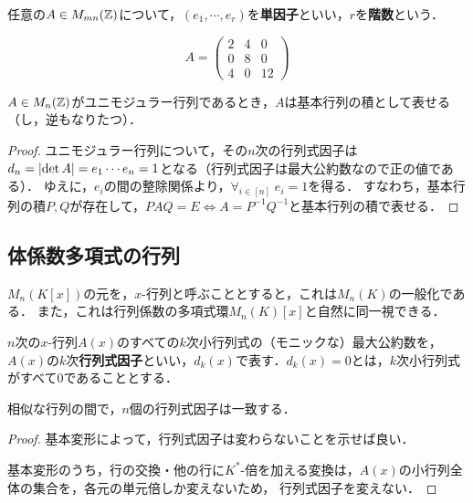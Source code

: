\documentclass[uplatex,dvipdfmx]{jsreport}
\begin{document}
\begin{definition}
    任意の$A\in M_{mn}(\mathbb{Z})$について，$(e_1,\cdots,e_r)$を\textbf{単因子}といい，$r$を\textbf{階数}という．
\end{definition}

\begin{example}
    \[A=\begin{pmatrix}2&4&0\\0&8&0\\4&0&12\end{pmatrix}\]
\end{example}

\begin{corollary}[ユニモジュラー行列の特徴付け]
    $A\in M_n(\mathbb{Z})$がユニモジュラー行列であるとき，$A$は基本行列の積として表せる（し，逆もなりたつ）．
\end{corollary}
\begin{proof}
    ユニモジュラー行列について，その$n$次の行列式因子は$d_n=\lvert\det A\rvert=e_1\cdots e_n=1$となる（行列式因子は最大公約数なので正の値である）．
    ゆえに，$e_i$の間の整除関係より，$\forall_{i\in[n]}\;e_i=1$を得る．
    すなわち，基本行列の積$P,Q$が存在して，$PAQ=E\Leftrightarrow A=P^{-1}Q^{-1}$と基本行列の積で表せる．
\end{proof}

\subsection{体係数多項式の行列}

\begin{tcolorbox}[colframe=ForestGreen, colback=ForestGreen!10!white,breakable,colbacktitle=ForestGreen!40!white,coltitle=black,fonttitle=\bfseries\sffamily,
title=]
    $M_n(K[x])$の元を，$x$-行列と呼ぶこととすると，これは$M_n(K)$の一般化である．
    また，これは行列係数の多項式環$M_n(K)[x]$と自然に同一視できる．
\end{tcolorbox}

\begin{definition}
    $n$次の$x$-行列$A(x)$のすべての$k$次小行列式の（モニックな）最大公約数を，$A(x)$の$k$次\textbf{行列式因子}といい，$d_k(x)$で表す．$d_k(x)=0$とは，$k$次小行列式がすべて$0$であることとする．
\end{definition}
\begin{lemma}[行列式因子は行列の相似類を特徴付ける]
    相似な行列の間で，$n$個の行列式因子は一致する．
\end{lemma}
\begin{proof}
    基本変形によって，行列式因子は変わらないことを示せば良い．

    基本変形のうち，行の交換・他の行に$K^*$-倍を加える変換は，$A(x)$の小行列全体の集合を，各元の単元倍しか変えないため，
    行列式因子を変えない．
\end{proof}
\end{document}

